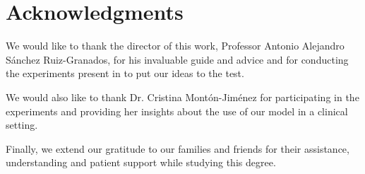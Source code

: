 \chapter*{Acknowledgments}
We would like to thank the director of this work, Professor Antonio Alejandro Sánchez Ruiz-Granados, for his invaluable guide and advice and for conducting the experiments present in  to put our ideas to the test.

We would also like to thank Dr. Cristina Montón-Jiménez for participating in the experiments and providing her insights about the use of our model in a clinical setting.

Finally, we extend our gratitude to our families and friends for their assistance, understanding and patient support while studying this degree.
